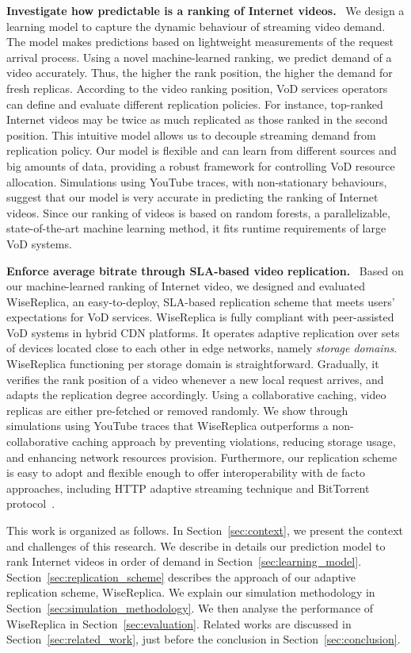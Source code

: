 \noindent
\textbf{Investigate how predictable is a ranking of Internet videos.} \ We design a learning model to capture the dynamic behaviour of streaming video demand. The model makes predictions based on lightweight measurements of the request arrival process. Using a novel machine-learned ranking, we predict demand of a video accurately. Thus, the higher the rank position, the higher the demand for fresh replicas. According to the video ranking position, VoD services operators can define and evaluate different replication policies. For instance, top-ranked Internet videos may be twice as much replicated as those ranked in the second position. This intuitive model allows us to decouple streaming demand from replication policy. Our model is flexible and can learn from different sources and big amounts of data, providing a robust framework for controlling VoD resource allocation. Simulations using YouTube traces, with non-stationary behaviours, suggest that our model is very accurate in predicting the ranking of Internet videos. Since our ranking of videos is based on random forests, a parallelizable, state-of-the-art machine learning method, it fits runtime requirements of large VoD systems.

\noindent
\textbf{Enforce average bitrate through SLA-based video replication.}
\ Based on our machine-learned ranking of Internet video, we designed
and evaluated WiseReplica, an easy-to-deploy, SLA-based replication
scheme that meets users' expectations for VoD services. WiseReplica is
fully compliant with peer-assisted VoD systems in hybrid CDN
platforms. It operates adaptive replication over sets of devices
located close to each other in edge networks, namely \emph{storage
  domains}. WiseReplica functioning per storage domain is
straightforward. Gradually, it verifies the rank position of a video
whenever a new local request arrives, and adapts the replication
degree accordingly. Using a collaborative caching, video replicas are
either pre-fetched or removed randomly. We show through simulations
using YouTube traces that WiseReplica outperforms a non-collaborative
caching approach by preventing violations, reducing storage usage, and enhancing network resources provision. Furthermore, our replication scheme is easy to adopt and flexible enough to offer interoperability with de facto approaches, including HTTP adaptive streaming technique and BitTorrent protocol~\cite{bittorrent_P2P_protocol}.


This work is organized as follows. In Section~\ref{sec:context}, 
we present the context and challenges of this research. We describe in
details our prediction model to rank Internet videos in order of
demand in
Section~\ref{sec:learning_model}. Section~\ref{sec:replication_scheme}
describes the approach of our adaptive replication scheme,
WiseReplica. We explain our simulation methodology in
Section~\ref{sec:simulation_methodology}. We then analyse the
performance of WiseReplica in Section~\ref{sec:evaluation}. Related
works are discussed in Section~\ref{sec:related_work}, just before the
conclusion in Section~\ref{sec:conclusion}.
